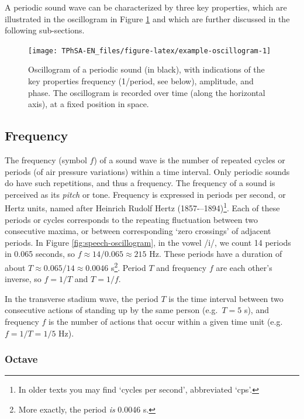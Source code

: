 \documentclass[
]{book}
\begin{document}
A periodic sound wave can be characterized by three key properties, which are illustrated in the oscillogram in Figure \ref{fig:example-oscillogram} and which are further discussed in the following sub-sections.

\begin{figure}

{\centering \texttt{[image: TPhSA-EN\_files/figure-latex/example-oscillogram-1]} 

}

\caption{Oscillogram of a periodic sound (in black), with indications of the key properties frequency (1/period, see below), amplitude, and phase. The oscillogram is recorded over time (along the horizontal axis), at a fixed position in space.}\label{fig:example-oscillogram}
\end{figure}

\subsection{Frequency}\label{sec:frequency}

The frequency (symbol \(f\)) of a sound wave is the number of repeated cycles or periods (of air pressure variations) within a time interval. Only periodic sounds do have such repetitions, and thus a frequency. The frequency of a sound is perceived as its \emph{pitch} or tone. Frequency is expressed in periods per second, or Hertz units, named after Heinrich Rudolf Hertz (1857-\/--1894)\footnote{In older texts you may find `cycles per second', abbreviated `cps'.}.
Each of these periods or cycles corresponds to the repeating fluctuation between two consecutive maxima, or between corresponding `zero crossings' of adjacent periods. In Figure \ref{fig:speech-oscillogram}, in the vowel /i/, we count 14 periods in 0.065 seconds, so \(f \approx 14/0.065 \approx 215\) Hz. These periods have a duration of about \(T \approx 0.065/14 \approx 0.0046\) s\footnote{More exactly, the period \emph{is} 0.0046 s.}. Period \(T\) and frequency \(f\) are each other's inverse, so \(f=1/T\) and \(T=1/f\).

In the transverse stadium wave, the period \(T\) is the time interval between two consecutive actions of standing up by the same person (e.g.~\(T=5\) s), and frequency \(f\) is the number of actions that occur within a given time unit (e.g.~\(f=1/T=1/5\) Hz).

\subsubsection{Octave}\label{sec:octave}
\end{document}
